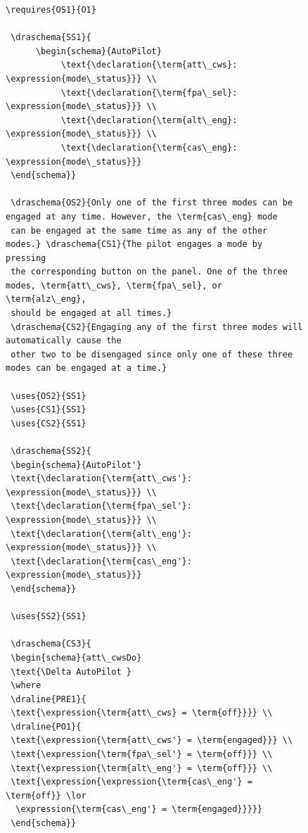 \begin{figure}[H]
\begin{minipage}{0.45\textwidth}
\begin{tiny}
\begin{BVerbatim}[commandchars=+\[\]]
 \requires{OS1}{O1}
 
 \draschema{SS1}{
      \begin{schema}{AutoPilot}
           \text{\declaration{\term{att\_cws}: \expression{mode\_status}}} \\
           \text{\declaration{\term{fpa\_sel}: \expression{mode\_status}}} \\
           \text{\declaration{\term{alt\_eng}: \expression{mode\_status}}} \\
           \text{\declaration{\term{cas\_eng}: \expression{mode\_status}}} 
 \end{schema}}
 
 \draschema{OS2}{Only one of the first three modes can be engaged at any time. However, the \term{cas\_eng} mode
 can be engaged at the same time as any of the other modes.} \draschema{CS1}{The pilot engages a mode by pressing
 the corresponding button on the panel. One of the three modes, \term{att\_cws}, \term{fpa\_sel}, or \term{alz\_eng},
 should be engaged at all times.}
 \draschema{CS2}{Engaging any of the first three modes will automatically cause the
 other two to be disengaged since only one of these three modes can be engaged at a time.}
 
 \uses{OS2}{SS1}
 \uses{CS1}{SS1}
 \uses{CS2}{SS1}
 
 \draschema{SS2}{
 \begin{schema}{AutoPilot'}
 \text{\declaration{\term{att\_cws'}: \expression{mode\_status}}} \\
 \text{\declaration{\term{fpa\_sel'}: \expression{mode\_status}}} \\
 \text{\declaration{\term{alt\_eng'}: \expression{mode\_status}}} \\
 \text{\declaration{\term{cas\_eng'}: \expression{mode\_status}}} 
 \end{schema}}
 
 \uses{SS2}{SS1}
 
 \draschema{CS3}{
 \begin{schema}{att\_cwsDo}
 \text{\Delta AutoPilot }
 \where
 \draline{PRE1}{
 \text{\expression{\term{att\_cws} = \term{off}}}} \\
 \draline{PO1}{
 \text{\expression{\term{att\_cws'} = \term{engaged}}} \\
 \text{\expression{\term{fpa\_sel'} = \term{off}}} \\
 \text{\expression{\term{alt\_eng'} = \term{off}}} \\
 \text{\expression{\expression{\term{cas\_eng'} = \term{off}} \lor
  \expression{\term{cas\_eng'} = \term{engaged}}}}}
 \end{schema}}
 

\end{BVerbatim}
\end{tiny}
\end{minipage}
\end{figure}
